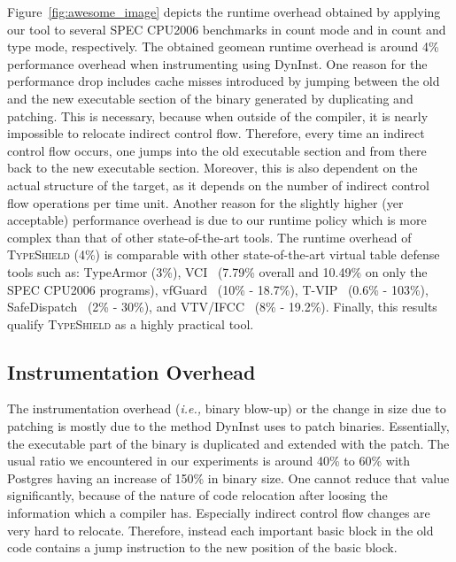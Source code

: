 Figure~\ref{fig:awesome_image} depicts the runtime overhead obtained by applying our tool to several SPEC CPU2006 benchmarks
in count mode and in count and type mode, respectively.
The obtained geomean runtime overhead is around 4\% performance overhead when instrumenting using DynInst. 
One reason for the performance drop includes cache misses introduced by jumping between the old and the new executable section 
of the binary generated by duplicating and patching. This is necessary, because when
outside of the compiler, it is nearly impossible to relocate indirect control flow. Therefore, 
every time an indirect control flow occurs, one jumps into the old executable section and from 
there back to the new executable section. Moreover, this is also dependent on the actual structure 
of the target, as it depends on the number of indirect control flow operations per time unit.
Another reason for the slightly higher (yer acceptable) performance overhead is due to our
runtime policy which is more complex than that of other state-of-the-art tools.
The runtime overhead of \textsc{TypeShield} (4\%) is comparable with other state-of-the-art virtual table defense
tools such as: TypeArmor (3\%), VCI~\cite{vci:asiaccs} (7.79\% overall and 10.49\% on only the SPEC CPU2006 programs), vfGuard~\cite{vfuard:aravind} (10\% - 18.7\%), T-VIP~\cite{gawlik} (0.6\% - 103\%), 
SafeDispatch~\cite{safedispatch:jang} (2\% - 30\%), and VTV/IFCC~\cite{vtv:tice} (8\% - 19.2\%).
Finally, this results qualify \textsc{TypeShield} as a highly practical tool.


\subsection{Instrumentation Overhead}
\label{section:typeshieldoverheadinstrumentation}


The instrumentation overhead (\textit{i.e.,} binary blow-up) or the change in size due to patching is mostly due to the method DynInst uses to patch binaries. 
Essentially, the executable part of the binary is duplicated and extended with the patch. The usual ratio we encountered in our experiments is 
around 40\% to 60\% with Postgres having an increase of 150\% in binary size. One cannot reduce that 
value significantly, because of the nature of code relocation after loosing the information which a compiler has. Especially indirect control flow 
changes are very hard to relocate. Therefore, instead each important basic block in the old code contains a jump instruction to the new position of the basic block.

